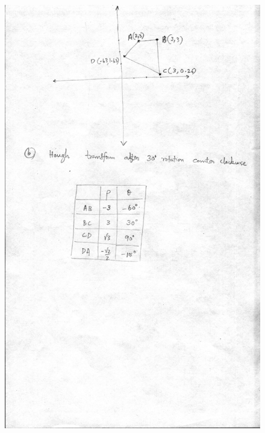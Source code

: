 \documentclass{article}
\begin{document}
\begin{figure}
\includegraphics[width=15cm]{qn5_2.jpg}
\end{figure}
\end{document}
